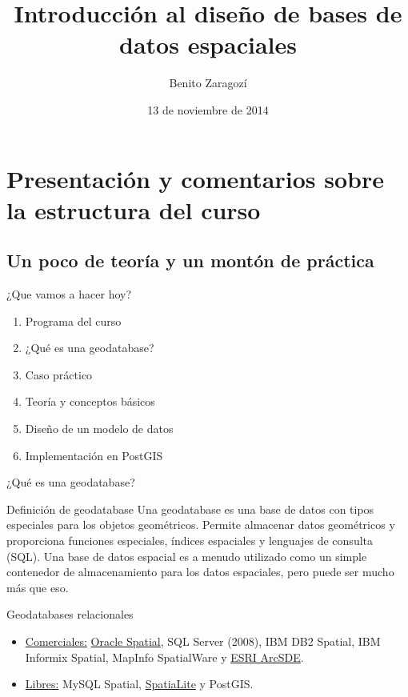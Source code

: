 \documentclass{classes/beamer_GeomaticaUA}
\author{Benito Zaragozí}
\title{Introducción al diseño de bases de datos espaciales}
\institute[GeomaticaLab]{Instituto Interuniversitario de Geografía\\Laboratorio de Geomática}
\date{13 de noviembre de 2014}
\begin{document}
\begin{frame}
\titlepage
\end{frame}

\section[Introducción]{Presentación y comentarios sobre la estructura del curso}
\subsection{Un poco de teoría y un montón de práctica}
\begin{frame}{¿Que vamos a hacer hoy?}
\begin{enumerate}
\item Programa del curso
\item ¿Qué es una geodatabase?
\item Caso práctico
\item Teoría y conceptos básicos
\item Diseño de un modelo de datos
\item Implementación en PostGIS
\end{enumerate}
\end{frame}

\begin{frame}{¿Qué es una geodatabase?}
\begin{block}{Definición de geodatabase}
Una geodatabase es una base de datos con tipos especiales para los objetos geométricos. Permite almacenar datos geométricos y proporciona funciones especiales, índices espaciales y lenguajes de consulta (SQL). Una base de datos espacial es a menudo utilizado como un simple contenedor de almacenamiento para los datos espaciales, pero puede ser mucho más que eso.
\end{block}

\begin{exampleblock}{Geodatabases relacionales}
\begin{itemize}
\item \underline{Comerciales:} \href{http://en.wikipedia.org/wiki/Oracle\_Spatial}{Oracle Spatial}, SQL Server (2008), IBM DB2 Spatial, IBM Informix Spatial, MapInfo SpatialWare y \href{http://help.arcgis.com/es/arcgisserver/10.0/help/arcgis\_server\_dotnet\_help/index.html\#//009300000115000000}{ESRI ArcSDE}.
\item \underline{Libres:} MySQL Spatial, \href{http://en.wikipedia.org/wiki/SpatiaLite}{SpatiaLite} y PostGIS.
\end{itemize}
\end{exampleblock}
\end{frame}
\end{document}
